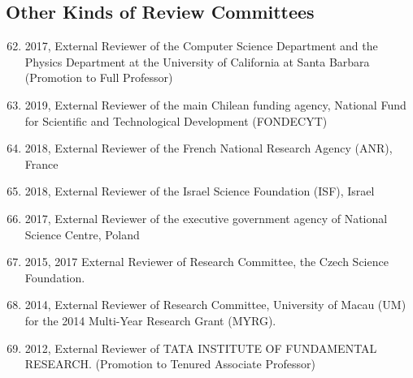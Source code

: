 \subsection{Other Kinds of Review Committees}
\begin{enumerate}
\setcounter{enumi}{61}
\item 2017,
External Reviewer of the Computer Science Department and 
the Physics Department at the University of California at Santa Barbara
(Promotion to Full Professor)

\item 2019, External Reviewer of 
the main Chilean funding agency, National Fund for Scientific and Technological Development (FONDECYT)

\item 2018, External Reviewer of 
the French National Research Agency (ANR), France

\item 2018, External Reviewer of 
the Israel Science Foundation (ISF), Israel

\item 2017, External Reviewer of 
the executive government agency of National Science Centre, Poland

\item 2015, 2017 External Reviewer of 
Research Committee, the Czech Science Foundation.

\item 2014, External Reviewer of 
Research Committee, University of Macau (UM) for the 2014 Multi-Year Research Grant (MYRG).

\item 2012,
External Reviewer of 
TATA INSTITUTE OF FUNDAMENTAL RESEARCH.
(Promotion to Tenured Associate Professor)


\end{enumerate}

